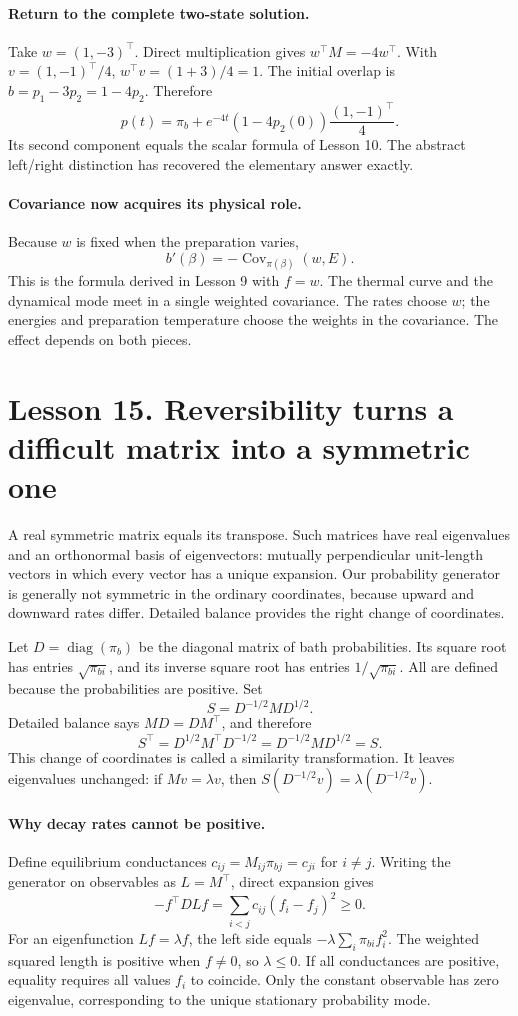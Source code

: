 \documentclass[11pt]{article}
\newcommand{\diag}{\operatorname{diag}}
\newcommand{\Cov}{\operatorname{Cov}}
\begin{document}
\paragraph{Return to the complete two-state solution.}
Take $w=(1,-3)^\top$. Direct multiplication gives $w^\top M=-4w^\top$.
With $v=(1,-1)^\top/4$, $w^\top v=(1+3)/4=1$. The initial overlap is
$b=p_1-3p_2=1-4p_2$. Therefore
\[
p(t)=\pi_b+e^{-4t}(1-4p_2(0))\frac{(1,-1)^\top}{4}.
\]
Its second component equals the scalar formula of Lesson 10. The abstract
left/right distinction has recovered the elementary answer exactly.

\paragraph{Covariance now acquires its physical role.}
Because $w$ is fixed when the preparation varies,
\[
b'(\beta)=-\Cov_{\pi(\beta)}(w,E).
\]
This is the formula derived in Lesson 9 with $f=w$. The thermal curve and the
dynamical mode meet in a single weighted covariance. The rates choose $w$;
the energies and preparation temperature choose the weights in the covariance.
The effect depends on both pieces.

\clearpage
\section*{Lesson 15. Reversibility turns a difficult matrix into a symmetric one}
A real symmetric matrix equals its transpose. Such matrices have real
eigenvalues and an orthonormal basis of eigenvectors: mutually perpendicular
unit-length vectors in which every vector has a unique expansion. Our probability
generator is generally not symmetric in the ordinary coordinates, because
upward and downward rates differ. Detailed balance provides the right change
of coordinates.

Let $D=\diag(\pi_b)$ be the diagonal matrix of bath probabilities. Its square
root has entries $\sqrt{\pi_{bi}}$, and its inverse square root has entries
$1/\sqrt{\pi_{bi}}$. All are defined because the probabilities are positive.
Set
\[
S=D^{-1/2}MD^{1/2}.
\]
Detailed balance says $MD=DM^\top$, and therefore
\[
S^\top=D^{1/2}M^\top D^{-1/2}
=D^{-1/2}MD^{1/2}=S.
\]
This change of coordinates is called a similarity transformation. It leaves
eigenvalues unchanged: if $Mv=\lambda v$, then
$S(D^{-1/2}v)=\lambda(D^{-1/2}v)$.

\paragraph{Why decay rates cannot be positive.}
Define equilibrium conductances $c_{ij}=M_{ij}\pi_{bj}=c_{ji}$ for $i\ne j$.
Writing the generator on observables as $L=M^\top$, direct expansion gives
\[
-f^\top DLf=\sum_{i<j}c_{ij}(f_i-f_j)^2\geq0.
\]
For an eigenfunction $Lf=\lambda f$, the left side equals
$-\lambda\sum_i\pi_{bi}f_i^2$. The weighted squared length is positive
when $f\ne0$, so $\lambda\leq0$. If all conductances are positive, equality
requires all values $f_i$ to coincide. Only the constant observable has
zero eigenvalue, corresponding to the unique stationary probability mode.
\end{document}
